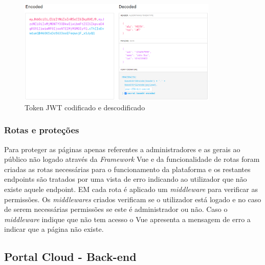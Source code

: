  \begin{figure}[ht]
\centering
\includegraphics[width=0.85\textwidth]{images/jwt.png}
\caption{Token JWT codificado e descodificado \cite{jwt}}\label{jwt1}
\end{figure}

\subsubsection{Rotas e proteções}

\par Para proteger as páginas apenas referentes a administradores e as gerais ao público não logado através da \textit{Framework} Vue e da funcionalidade de rotas foram criadas as rotas necessárias para o funcionamento da plataforma e os restantes endpoints são tratados por uma vista de erro indicando ao utilizador que não existe aquele endpoint. EM cada rota é aplicado um \textit{middleware} para verificar as permissões. Os \textit{middlewares} criados verificam se o utilizador está logado e no caso de serem necessárias permissões se este é administrador ou não. Caso o \textit{middleware} indique que não tem acesso o Vue apresenta a mensagem de erro a indicar que a página não existe.

\subsection{Portal Cloud - Back-end}

